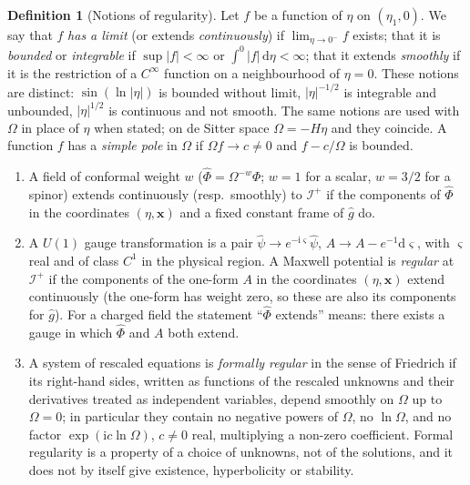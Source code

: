 \documentclass[11pt,a4paper]{article}
\theoremstyle{definition}
\newtheorem{definition}{Definition}
\newcommand{\scri}{\mathscr{I}^{+}}
\newcommand{\dd}{\mathrm{d}}
\newcommand{\ii}{\mathrm{i}}
\newcommand{\hg}{\hat g}
\newcommand{\hpsi}{\hat\psi}
\begin{document}
\begin{definition}[Notions of regularity]
\label{def:reg}
Let $f$ be a function of $\eta$ on $(\eta_{1},0)$. We say that $f$ \emph{has a limit} (or extends \emph{continuously}) if $\lim_{\eta\to0^{-}}f$ exists; that it is \emph{bounded} or \emph{integrable} if $\sup|f|<\infty$ or $\int^{0}|f|\,\dd\eta<\infty$; that it extends \emph{smoothly} if it is the restriction of a $C^{\infty}$ function on a neighbourhood of $\eta=0$. These notions are distinct: $\sin(\ln|\eta|)$ is bounded without limit, $|\eta|^{-1/2}$ is integrable and unbounded, $|\eta|^{1/2}$ is continuous and not smooth. The same notions are used with $\Omega$ in place of $\eta$ when stated; on de Sitter space $\Omega=-H\eta$ and they coincide. A function $f$ has a \emph{simple pole} in $\Omega$ if $\Omega f\to c\neq0$ and $f-c/\Omega$ is bounded.
\begin{enumerate}[label=(\alph*)]
\item A field of conformal weight $w$ ($\hat\Phi=\Omega^{-w}\Phi$; $w=1$ for a scalar, $w=3/2$ for a spinor) extends continuously (resp.\ smoothly) to $\scri$ if the components of $\hat\Phi$ in the coordinates $(\eta,\mathbf{x})$ and a fixed constant frame of $\hg$ do.
\item A $U(1)$ gauge transformation is a pair $\hpsi\to e^{-\ii\varsigma}\hpsi$, $A\to A-e^{-1}\dd\varsigma$, with $\varsigma$ real and of class $C^{1}$ in the physical region. A Maxwell potential is \emph{regular} at $\scri$ if the components of the one-form $A$ in the coordinates $(\eta,\mathbf{x})$ extend continuously (the one-form has weight zero, so these are also its components for $\hg$). For a charged field the statement ``$\hat\Phi$ extends'' means: there exists a gauge in which $\hat\Phi$ and $A$ both extend.
\item A system of rescaled equations is \emph{formally regular} in the sense of Friedrich \cite{Friedrich2015} if its right-hand sides, written as functions of the rescaled unknowns and their derivatives treated as independent variables, depend smoothly on $\Omega$ up to $\Omega=0$; in particular they contain no negative powers of $\Omega$, no $\ln\Omega$, and no factor $\exp(\ii c\ln\Omega)$, $c\neq0$ real, multiplying a non-zero coefficient. Formal regularity is a property of a choice of unknowns, not of the solutions, and it does not by itself give existence, hyperbolicity or stability.
\end{enumerate}
\end{definition}
\end{document}

